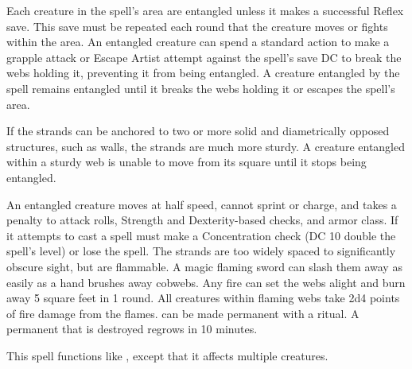 \spellrng{\rngclose}
\begin{spelleffect}
  Each creature in the spell's area are entangled unless it makes a successful Reflex save. This save must be repeated each round that the creature moves or fights within the area. An entangled creature can spend a standard action to make a grapple attack or Escape Artist attempt against the spell's save DC to break the webs holding it, preventing it from being entangled. A creature entangled by the spell remains entangled until it breaks the webs holding it or escapes the spell's area.
  \par If the strands can be anchored to two or more solid and diametrically opposed structures, such as walls, the strands are much more sturdy. A creature entangled within a sturdy web is unable to move from its square until it stops being entangled.
\end{spelleffect}
\begin{spellnotes}
  An entangled creature moves at half speed, cannot sprint or charge, and takes a  penalty to attack rolls, Strength and Dexterity-based checks, and armor class. If it attempts to cast a spell must make a Concentration check (DC 10 \add double the spell's level) or lose the spell.
  The strands are too widely spaced to significantly obscure sight, but are flammable. A magic flaming sword can slash them away as easily as a hand brushes away cobwebs. Any fire can set the webs alight and burn away 5 square feet in 1 round. All creatures within flaming webs take 2d4 points of fire damage from the flames.
   can be made permanent with a  ritual. A permanent  that is destroyed regrows in 10 minutes.
\end{spellnotes}

\begin{spelleffect}
  This spell functions like , except that it affects multiple creatures.
\end{spelleffect}

